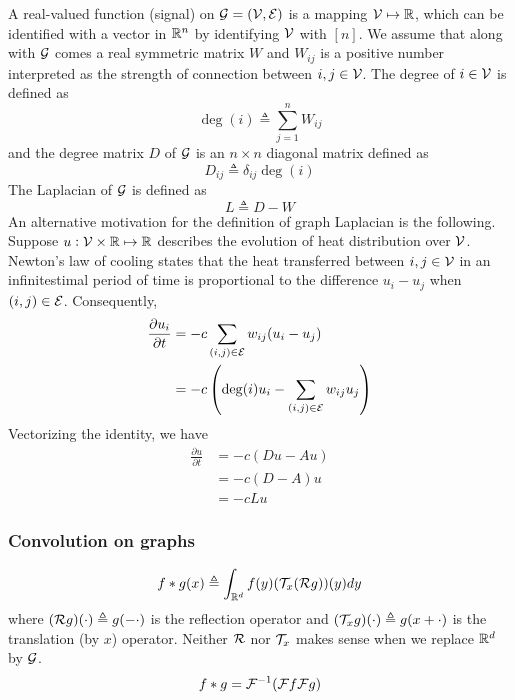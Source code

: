 \documentclass{article}
\DeclareMathOperator{\deg}{deg}
\newcommand{\pp}[2]{{\frac{\partial {#1}}{\partial {#2}}}}
\begin{document}
A real-valued function (signal) on ${\mathcal G} = ({\mathcal V}, {\mathcal E})$ is a mapping ${\mathcal V} \mapsto {\mathbb R}$, which can be identified with a vector in ${\mathbb R}^n$ by identifying ${\mathcal V}$ with $[n]$.
We assume that along with ${\mathcal G}$ comes a real symmetric matrix $W$ and $W_{i j}$ is a positive number interpreted as the strength of connection between $i, j \in {\mathcal V}$.
The degree of $i \in {\mathcal V}$ is defined as
\[
\deg (i) \triangleq \sum_{j = 1}^n W_{i j}
\]
and the degree matrix $D$ of ${\mathcal G}$ is an $n \times n$ diagonal matrix defined as
\[
D_{i j} \triangleq \delta_{i j} \deg (i)
\]
The Laplacian of ${\mathcal G}$ is defined as
\[
L \triangleq D - W
\]
An alternative motivation for the definition of graph Laplacian is the following.
Suppose $u: {\mathcal V} \times {\mathbb R} \mapsto {\mathbb R}$ describes the evolution of heat distribution over ${\mathcal V}$.
Newton's law of cooling states that the heat transferred between $i, j \in {\mathcal V}$ in an infinitestimal period of time is proportional to the difference $u_i - u_j$ when $(i, j) \in {\mathcal E}$.
Consequently,
\begin{align*}
\pp{u_i}{t}
& = -c \sum_{(i, j) \in \cale} w_{i j} (u_i - u_j) \\
& = -c \left(\deg (i) u_i - \sum_{(i, j) \in \cale} w_{i j} u_j\right)
\end{align*}
Vectorizing the identity, we have
\begin{align*}
\pp{u}{t}
& = -c (D u - A u) \\
& = -c (D - A) u \\
& = -c L u
\end{align*}

\subsubsection{Convolution on graphs}

\begin{equation*}
f * g (x) \triangleq \int_{{\mathbb R}^d} f(y) ({\mathcal T}_x ({\mathcal R} g)) (y) dy
\end{equation*}
where $({\mathcal R} g) (\cdot) \triangleq g(-\cdot)$ is the reflection operator and $({\mathcal T}_x g) (\cdot) \triangleq g(x + \cdot)$ is the translation (by $x$) operator.
Neither ${\mathcal R}$ nor ${\mathcal T}_x$ makes sense when we replace ${\mathbb R}^d$ by ${\mathcal G}$.
\begin{equation*}
f * g = {\mathcal F}^{-1} ({\mathcal F}  f {\mathcal F} g)
\end{equation*}
\end{document}
